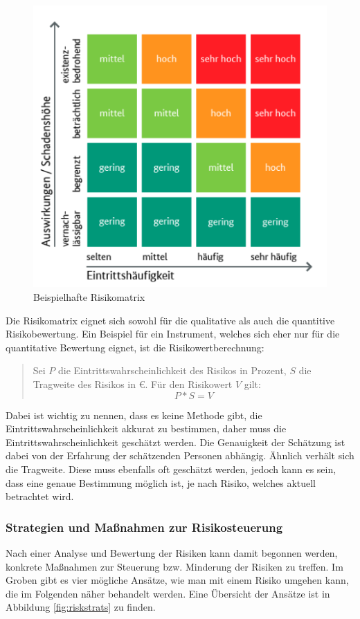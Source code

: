 \documentclass[ThesisDJ.tex]{subfiles}
\begin{document}
\begin{figure}
    \centering
    \includegraphics[width=0.6\linewidth]{risikomatrix.png}
    \caption{Beispielhafte Risikomatrix}
    \label{fig:riskmatrix}
\end{figure}

Die Risikomatrix eignet sich sowohl für die qualitative als auch die quantitive Risikobewertung. Ein Beispiel für ein Instrument, welches sich eher nur für die quantitative Bewertung eignet, ist die Risikowertberechnung:

\begin{quote}
    Sei $P$ die Eintrittswahrscheinlichkeit des Risikos in Prozent, $S$ die Tragweite des Risikos in €. Für den Risikowert $V$ gilt:
    \[ P * S = V \]  
\end{quote}

Dabei ist wichtig zu nennen, dass es keine Methode gibt, die Eintrittswahrscheinlichkeit akkurat zu bestimmen, daher muss die Eintrittswahrscheinlichkeit geschätzt werden. Die Genauigkeit der Schätzung ist dabei von der Erfahrung der schätzenden Personen abhängig. Ähnlich verhält sich die Tragweite. Diese muss ebenfalls oft geschätzt werden, jedoch kann es sein, dass eine genaue Bestimmung möglich ist, je nach Risiko, welches aktuell betrachtet wird.

\subsubsection{Strategien und Maßnahmen zur Risikosteuerung}
Nach einer Analyse und Bewertung der Risiken kann damit begonnen werden, konkrete Maßnahmen zur Steuerung bzw. Minderung der Risiken zu treffen. Im Groben gibt es vier mögliche Ansätze, wie man mit einem Risiko umgehen kann, die im Folgenden näher behandelt werden. Eine Übersicht der Ansätze ist in Abbildung \ref{fig:riskstrats}\cite[(Section 2)S.~25]{cicek2022risikomanagement} zu finden.
\end{document}
